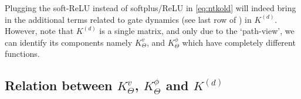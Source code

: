 Plugging the soft-ReLU instead of softplus/ReLU in \eqref{eq:ntkold} will indeed bring in the additional terms related to gate dynamics (see last row of ) in $K^{(d)}$. However, note that $K^{(d)}$ is a single matrix, and only due to the `path-view', we can identify its components namely $K^v_{\Theta}$, and $K^{\phi}_{\Theta}$ which have completely different functions.
\subsection{Relation between $K^v_{\Theta}$, $K^{\phi}_{\Theta}$ and $K^{(d)}$ }